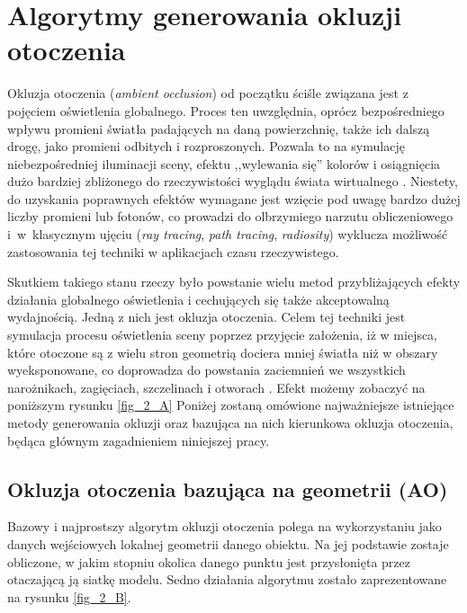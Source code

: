 \chapter{Algorytmy generowania okluzji otoczenia}
\label{t:teoria}

Okluzja otoczenia (\textit{ambient occlusion}) od początku ściśle związana jest z pojęciem oświetlenia globalnego. Proces ten uwzględnia, oprócz bezpośredniego wpływu promieni światła padających na daną powierzchnię, także ich dalszą drogę, jako promieni odbitych i rozproszonych. Pozwala to na symulację niebezpośredniej iluminacji sceny, efektu ,,wylewania się'' kolorów i osiągnięcia dużo bardziej zbliżonego do rzeczywistości wyglądu świata wirtualnego \cite{global-illum}. Niestety, do uzyskania poprawnych efektów wymagane jest wzięcie pod uwagę bardzo dużej liczby promieni lub fotonów, co prowadzi do olbrzymiego narzutu obliczeniowego i~w~klasycznym ujęciu (\textit{ray tracing}, \textit{path tracing}, \textit{radiosity}) wyklucza możliwość zastosowania tej techniki w aplikacjach czasu rzeczywistego.

Skutkiem takiego stanu rzeczy było powstanie wielu metod przybliżających efekty działania globalnego oświetlenia i cechujących się także akceptowalną wydajnością. Jedną z nich jest okluzja otoczenia. Celem tej techniki jest symulacja procesu oświetlenia sceny poprzez przyjęcie założenia, iż w miejsca, które otoczone są z wielu stron geometrią dociera mniej światła niż w obszary wyeksponowane, co doprowadza do powstania zaciemnień we wszystkich narożnikach, zagięciach, szczelinach i otworach \cite{ao}. Efekt możemy zobaczyć na poniższym rysunku \ref{fig_2_A} Poniżej zostaną omówione najważniejsze istniejące metody generowania okluzji oraz bazująca na nich kierunkowa okluzja otoczenia, będąca głównym zagadnieniem niniejszej pracy.


	\section{Okluzja otoczenia bazująca na geometrii (AO)}
	\label{t:teoria:geom}
	
	Bazowy i najprostszy algorytm okluzji otoczenia polega na wykorzystaniu jako danych wejściowych lokalnej geometrii danego obiektu. Na jej podstawie zostaje obliczone, w jakim stopniu okolica danego punktu jest przysłonięta przez otaczającą ją siatkę modelu. Sedno działania algorytmu zostało zaprezentowane na rysunku \ref{fig_2_B}.
	

